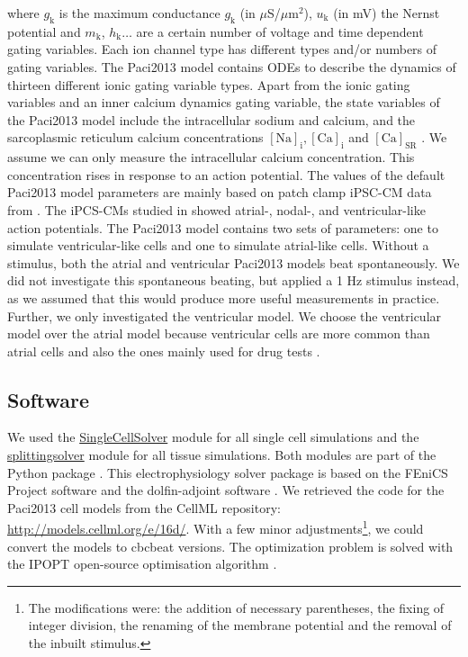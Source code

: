 \documentclass{article}
\begin{document}
where $g_{\mathrm{k}}$ is the maximum conductance $g_{\mathrm{k}}$ (in $\mu$S/$\mu$m$^2$), $u_{\mathrm{k}}$ (in mV) the Nernst potential and $m_{\mathrm{k}}$, $h_{\mathrm{k}} \ldots$ are a certain number of voltage and time dependent gating variables. Each ion channel type has different types and/or numbers of gating variables. The Paci2013 model contains ODEs to describe the dynamics of thirteen different ionic gating variable types. Apart from the ionic gating variables and an inner calcium dynamics gating variable, the state variables of the Paci2013 model include the intracellular sodium and calcium, and the sarcoplasmic reticulum calcium concentrations $[\mathrm{Na}]_\mathrm{i}, [\mathrm{Ca}]_{\mathrm{i}}$ and $[\mathrm{Ca}]_{\mathrm{SR}}$ \cite{Paci2013}. We assume we can only measure the intracellular calcium concentration. This concentration rises in response to an action potential. The values of the default Paci2013 model parameters are mainly based on patch clamp iPSC-CM data from \cite{Ma2011}. The iPCS-CMs studied in \cite{Ma2011} showed atrial-, nodal-, and ventricular-like action potentials. The Paci2013 model contains two sets of parameters: one to simulate ventricular-like cells and one to simulate atrial-like cells. Without a stimulus, both the atrial and ventricular Paci2013 models beat spontaneously. We did not investigate this spontaneous beating, but applied a 1 Hz stimulus instead, as we assumed that this would produce more useful measurements in practice. Further, we only investigated the ventricular model. We choose the ventricular model over the atrial model because ventricular cells are more common than atrial cells and also the ones mainly used for drug tests \cite{Paci2015}.
\subsection{Software} \label{Software}
We used the \url{SingleCellSolver} module for all single cell simulations and the \url{splittingsolver} module for all tissue simulations. Both modules are part of the Python package \cite{cbcbeat, cbcbeat2}. This electrophysiology solver package is based on the FEniCS Project software \cite{fenics, fenics2} and the dolfin-adjoint software \cite{dolfin-adjoint, dolfin-adjoint2}. We retrieved the code for the Paci2013 cell models from the CellML repository: \url{http://models.cellml.org/e/16d/}. With a few minor adjustments\footnote{The modifications were: the addition of necessary parentheses, the fixing of integer division, the renaming of the membrane potential and the removal of the inbuilt stimulus.}, we could convert the models to cbcbeat versions. 
The optimization problem is solved with the IPOPT open-source optimisation algorithm \cite{Wachter2006}.
\end{document}
